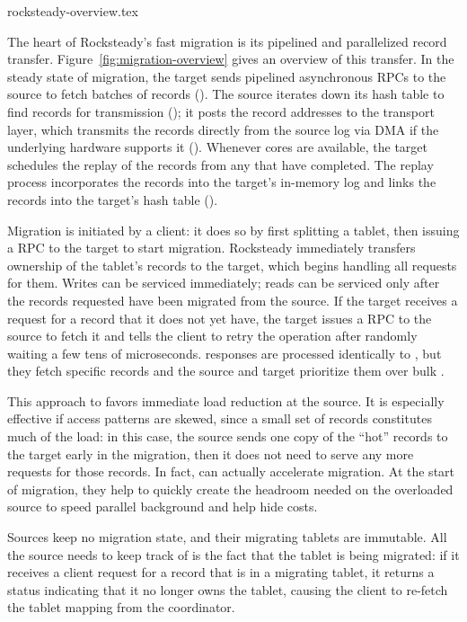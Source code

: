  {rocksteady-overview.tex}

The heart of Rocksteady's fast migration is its pipelined and
parallelized record transfer. Figure~\ref{fig:migration-overview} gives an
overview of this transfer.  In the steady state of migration, the target
sends pipelined asynchronous \pull RPCs to the source to
fetch batches of records (\one). The source iterates down its hash table to
find records for transmission (\two); it posts the
record addresses to the transport layer, which transmits the records directly from the source log
via DMA if the underlying hardware supports it (\three). Whenever cores are available, the target schedules the
    replay of the records from any \pulls that have completed. The replay process
incorporates the records into the target's in-memory log and links the records
into the target's hash table (\four).

Migration is initiated by a client: it does so by first splitting a tablet,
then issuing a \mt
RPC to the target to start migration.
Rocksteady immediately transfers ownership of the tablet's records to the target,
which begins handling all requests for them.
Writes can be serviced immediately; reads can be serviced only after
the records requested have been migrated from the source.  If the target
receives a request for a record that it does not yet have, the 
target issues a \priopull RPC to the
source to fetch it and tells the client to retry the operation after randomly waiting a
few tens of microseconds. \priopull{} responses are processed identically to
\pulls, but they fetch specific records and the source and target prioritize
them over bulk \pulls.

This approach to \priopulls favors immediate load
reduction at the source. It is especially effective if access patterns are
skewed, since a small set of records constitutes much of the load: in this
case, the source sends one copy of the ``hot'' records to the target early
in the migration, then it does not need to serve any more requests for those
records.  In fact, \priopulls can actually 
accelerate migration. At the start of migration, they help to quickly create the
headroom needed on the overloaded source to speed parallel background \pulls
and help hide \pull costs.

Sources
keep no migration state, and their migrating tablets are immutable. All the
source needs to keep track of is the fact that the tablet is being migrated: if
it receives a client request for a record that is in a migrating tablet,
it returns a status indicating that it no longer owns the tablet, causing the
client to re-fetch the tablet mapping from the coordinator.

